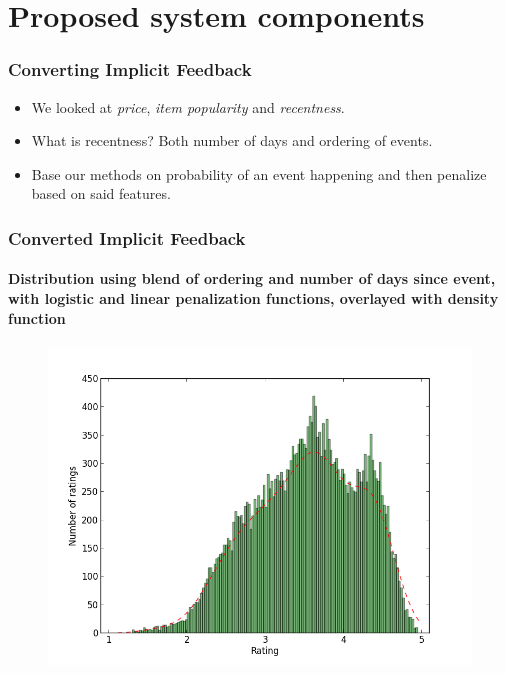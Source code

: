 \documentclass{beamer}
\begin{document}
  \section{Proposed system components}

  \begin{frame}
    \frametitle{Converting Implicit Feedback}
    \begin{itemize}
      \item We looked at \textit{price}, \textit{item popularity} and
      \textit{recentness}.
      \item What is recentness? Both number of days and ordering of events.
      \item Base our methods on probability of an event happening and then
      penalize based on said features.
    \end{itemize}
  \end{frame}

  \begin{frame}
    \frametitle{Converted Implicit Feedback}
    \framesubtitle{Distribution using blend of ordering and number of days since event, with logistic and linear penalization functions, overlayed with density function}
    \begin{figure}[H]
        \includegraphics[scale=0.4]{../src/image/dist-blend-price-popularity-recentness}
        \centering
    \end{figure}
  \end{frame}
\end{document}
